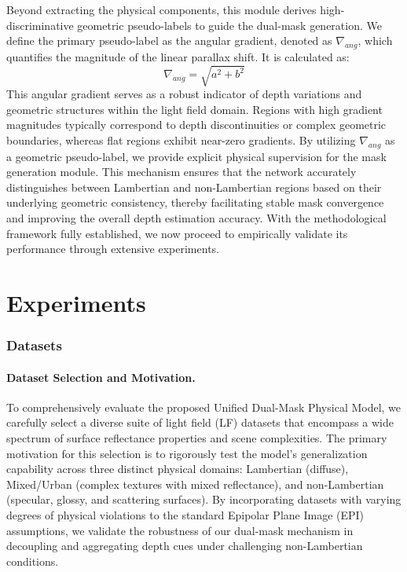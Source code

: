 \documentclass[lettersize,journal]{IEEEtran}
\begin{document}
Beyond extracting the physical components, this module derives high-discriminative geometric pseudo-labels to guide the dual-mask generation. We define the primary pseudo-label as the angular gradient, denoted as $\nabla_{ang}$, which quantifies the magnitude of the linear parallax shift. It is calculated as:
\begin{equation}
\label{eq:eq6}
\nabla_{ang} = \sqrt{a^2 + b^2}
\end{equation}
This angular gradient serves as a robust indicator of depth variations and geometric structures within the light field domain. Regions with high gradient magnitudes typically correspond to depth discontinuities or complex geometric boundaries, whereas flat regions exhibit near-zero gradients. By utilizing $\nabla_{ang}$ as a geometric pseudo-label, we provide explicit physical supervision for the mask generation module. This mechanism ensures that the network accurately distinguishes between Lambertian and non-Lambertian regions based on their underlying geometric consistency, thereby facilitating stable mask convergence and improving the overall depth estimation accuracy. With the methodological framework fully established, we now proceed to empirically validate its performance through extensive experiments.

\section{Experiments}

\subsubsection{Datasets}

\paragraph{Dataset Selection and Motivation.}
To comprehensively evaluate the proposed Unified Dual-Mask Physical Model, we carefully select a diverse suite of light field (LF) datasets that encompass a wide spectrum of surface reflectance properties and scene complexities. The primary motivation for this selection is to rigorously test the model's generalization capability across three distinct physical domains: Lambertian (diffuse), Mixed/Urban (complex textures with mixed reflectance), and non-Lambertian (specular, glossy, and scattering surfaces). By incorporating datasets with varying degrees of physical violations to the standard Epipolar Plane Image (EPI) assumptions, we validate the robustness of our dual-mask mechanism in decoupling and aggregating depth cues under challenging non-Lambertian conditions.
\end{document}
